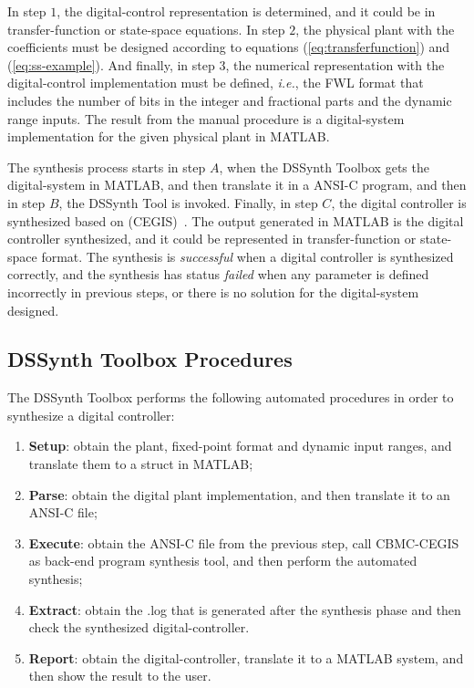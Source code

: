 \documentclass[sigconf]{acmart}
\newcommand\tool{{DSSynth Toolbox}\xspace}
\begin{document}
In step $1$, the digital-control representation is determined, and it could be in transfer-function or state-space equations. In step $2$, the physical plant with the coefficients must be designed according to equations (\ref{eq:transferfunction}) and (\ref{eq:ss-example}). And finally, in step $3$, the numerical representation with the digital-control implementation must be defined, {\it i.e.}, the FWL format that includes the number of bits in the integer and fractional parts and the dynamic range inputs. The result from the manual procedure is a digital-system implementation for the given physical plant in MATLAB. 

The synthesis process starts in step $A$, when the \tool gets the digital-system in MATLAB, and then translate it in a ANSI-C program, and then in step $B$, the DSSynth Tool is invoked. Finally, in step $C$, the digital controller is synthesized based on (CEGIS)~\cite{DBLP:conf/asplos/Solar-LezamaTBSS06}. The output generated in MATLAB is the digital controller synthesized, and it could be represented in transfer-function or state-space format. The synthesis is \emph{successful} when a digital controller is synthesized correctly, and the synthesis has status \emph{failed} when any parameter is defined incorrectly in previous steps, or there is no solution for the digital-system designed.
 
\subsection{\tool Procedures}

The \tool performs the following automated procedures in order to synthesize a digital controller:

\begin{enumerate}
\item \textbf{Setup}: obtain the plant, fixed-point format and dynamic input ranges, and translate them to a struct in MATLAB;
\item \textbf{Parse}: obtain the digital plant implementation, and then translate it to an ANSI-C file;
\item \textbf{Execute}: obtain the ANSI-C file from the previous step, call CBMC-CEGIS as back-end program synthesis tool, and then perform the automated synthesis;
\item \textbf{Extract}: obtain the .log that is generated after the synthesis phase and then check the synthesized digital-controller.
\item \textbf{Report}: obtain the digital-controller, translate it to a MATLAB system, and then show the result to the user.
\end{enumerate}
\end{document}

